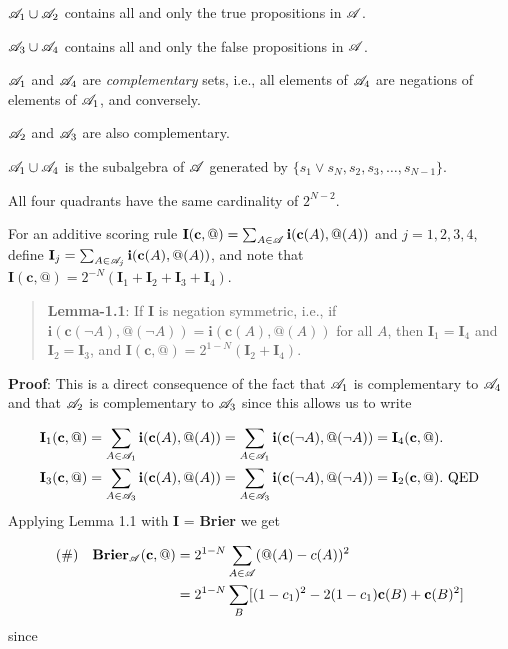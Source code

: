 \begin{enumerate*}
\renewcommand\labelenumi{(\roman{enumi})}
\item $\mathscr{A}_1 \cup \mathscr{A}_2$ contains all and only the true propositions in $\mathscr{A}$.
\item $\mathscr{A}_3 \cup \mathscr{A}_4$ contains all and only the false propositions in $\mathscr{A}$.
\item $\mathscr{A}_1$ and $\mathscr{A}_4$ are \emph{complementary} sets, i.e., all elements of $\mathscr{A}_4$ are negations of elements of $\mathscr{A}_1$, and conversely. 
\item $\mathscr{A}_2$ and $\mathscr{A}_3$ are also complementary.
\item $\mathscr{A}_1 \cup \mathscr{A}_4$ is the subalgebra of $\mathscr{A}$ generated by $\{s_1 \vee s_N, s_2, s_3, \dots, s_{N-1}\}$.
\item All four quadrants have the same cardinality of $2^{N-2}$.
\end{enumerate*}
For an additive scoring rule 
$\mathbf{I}(\mathbf{c}, @) = \sum_{A \in \mathscr{A}}\mathbf{i}(\mathbf{c}(A), @(A))$ 
and $j = 1, 2, 3, 4$, define 
$\mathbf{I}_j = \sum_{A \in \mathscr{A}_j}\mathbf{i}(\mathbf{c}(A), @(A))$, 
and note that $\mathbf{I}(\mathbf{c}, @) = 2^{-N}(\mathbf{I}_1 + \mathbf{I}_2 + \mathbf{I}_3 + \mathbf{I}_4)$.

\begin{quote}
\textbf{Lemma-1.1}: If $\textbf{I}$ is negation symmetric, i.e., if $\mathbf{i}(\mathbf{c}(\neg A), @(\neg A)) = \mathbf{i}(\mathbf{c}(A), @(A))$ for all $A$, then $\mathbf{I}_1 = \mathbf{I}_4$ and $\mathbf{I}_2 = \mathbf{I}_3$, and $\mathbf{I}(\mathbf{c},@) = 2^{1-N}(\mathbf{I}_2 + \mathbf{I}_4)$. 
\end{quote}
\textbf{Proof}: This is a direct consequence of the fact that $\mathscr{A}_1$ is complementary to $\mathscr{A}_4$ and that $\mathscr{A}_2$ is complementary to $\mathscr{A}_3$ since this allows us to write

\begin{align*}
\mathbf{I}_1(\mathbf{c},@) &= \sum_{A \in \mathscr{A}_1} \mathbf{i}(\mathbf{c}(A), @(A)) = \sum_{A \in \mathscr{A}_1} \mathbf{i}(\mathbf{c}(\neg A), @(\neg A)) = \mathbf{I}_4(\mathbf{c},@). \\
\mathbf{I}_3(\mathbf{c},@) &= \sum_{A \in \mathscr{A}_3} \mathbf{i}(\mathbf{c}(A), @(A)) = \sum_{A \in \mathscr{A}_3} \mathbf{i}(\mathbf{c}(\neg A), @(\neg A)) = \mathbf{I}_2(\mathbf{c},@). \text{ QED}\\
\end{align*}
Applying Lemma 1.1 with \textbf{I} = \textbf{Brier} we get

\begin{align*}
(\#)\quad \mathbf{Brier}_{\mathscr{A}}(\mathbf{c}, @) &= 2^{1-N} \sum_{A \in \mathscr{A}} (@(A) - c(A))^2 \\
 &= 2^{1-N} \sum_B [(1-c_1)^2 - 2(1-c_1)\mathbf{c}(B) + \mathbf{c}(B)^2]
\end{align*}
since

